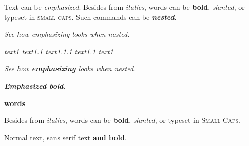 \documentclass{article}
\begin{document}
Text can be \emph{emphasized}.
Besides from \textit{italics}, words can be
\textbf{bold}, \textsl{slanted}, or typeset
in \textsc {small caps}. %
Such commands can be \textit{\textbf{nested}}.

\emph{See how \emph{emphasizing} looks when nested.} %

\emph{text1 \emph{text1.1 \emph{text1.1.1} text1.1} text1} %

\emph{See how \textbf{\emph{emphasizing}} looks when nested.} %

\emph{\textbf{Emphasized bold.}}

\textbf{\textbf{words}} %

Besides from {\itshape italics}, words can be
{\bfseries bold}, {\slshape slanted}, or typeset
in {\scshape Small Caps}.

Normal text, {\sffamily sans serif text {\bfseries and bold}}.
\end{document}
